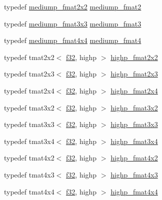 \begin{DoxyCompactItemize}
\item 
typedef \hyperlink{namespaceglm_a933dc07be88e05bf16cd823e99abf860}{mediump\+\_\+fmat2x2} \hyperlink{namespaceglm_a5b9de77ef7403ffc972700219eca5450}{mediump\+\_\+fmat2}
\item 
typedef \hyperlink{namespaceglm_a7719af89d88d87c3b60d7c9f06801711}{mediump\+\_\+fmat3x3} \hyperlink{namespaceglm_a85f2267401434ea8c5463af040f0760c}{mediump\+\_\+fmat3}
\item 
typedef \hyperlink{namespaceglm_ad4ee0ec08503fbbad983bb70cb91d15e}{mediump\+\_\+fmat4x4} \hyperlink{namespaceglm_a6cd3ae1f3509b79061edcc83564769d4}{mediump\+\_\+fmat4}
\item 
typedef tmat2x2$<$ \hyperlink{group__gtc__type__precision_ga0ec999b57f5330d9021256e96038df04}{f32}, highp $>$ \hyperlink{namespaceglm_a1497c01f2be9db9d69144537e00ff695}{highp\+\_\+fmat2x2}
\item 
typedef tmat2x3$<$ \hyperlink{group__gtc__type__precision_ga0ec999b57f5330d9021256e96038df04}{f32}, highp $>$ \hyperlink{namespaceglm_a09c7950cd49474ac5c651d55e6d75195}{highp\+\_\+fmat2x3}
\item 
typedef tmat2x4$<$ \hyperlink{group__gtc__type__precision_ga0ec999b57f5330d9021256e96038df04}{f32}, highp $>$ \hyperlink{namespaceglm_a7f52a65030238fab7c75fc3fff6267b7}{highp\+\_\+fmat2x4}
\item 
typedef tmat3x2$<$ \hyperlink{group__gtc__type__precision_ga0ec999b57f5330d9021256e96038df04}{f32}, highp $>$ \hyperlink{namespaceglm_ae084f1adc158cccc3b45d86d3eea10e7}{highp\+\_\+fmat3x2}
\item 
typedef tmat3x3$<$ \hyperlink{group__gtc__type__precision_ga0ec999b57f5330d9021256e96038df04}{f32}, highp $>$ \hyperlink{namespaceglm_a3390aa5d7faf93394576070f3bd2c1e7}{highp\+\_\+fmat3x3}
\item 
typedef tmat3x4$<$ \hyperlink{group__gtc__type__precision_ga0ec999b57f5330d9021256e96038df04}{f32}, highp $>$ \hyperlink{namespaceglm_a9447fb5acd76fe50d75dff7e9cc97b11}{highp\+\_\+fmat3x4}
\item 
typedef tmat4x2$<$ \hyperlink{group__gtc__type__precision_ga0ec999b57f5330d9021256e96038df04}{f32}, highp $>$ \hyperlink{namespaceglm_a313d7eb585bba68a553493a8768adc85}{highp\+\_\+fmat4x2}
\item 
typedef tmat4x3$<$ \hyperlink{group__gtc__type__precision_ga0ec999b57f5330d9021256e96038df04}{f32}, highp $>$ \hyperlink{namespaceglm_a76d5f04bc31dec799810a4d9d9eb35d2}{highp\+\_\+fmat4x3}
\item 
typedef tmat4x4$<$ \hyperlink{group__gtc__type__precision_ga0ec999b57f5330d9021256e96038df04}{f32}, highp $>$ \hyperlink{namespaceglm_a57e1bf855a227322e9a9809f03c7f111}{highp\+\_\+fmat4x4}

\end{DoxyCompactItemize}
